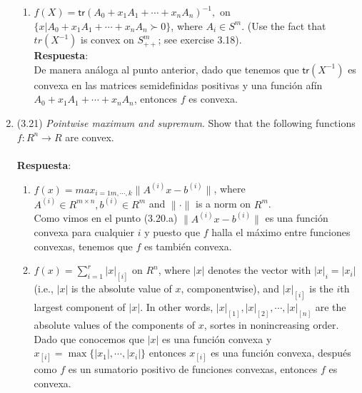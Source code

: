 \documentclass[12pt, oneside]{article}%
\begin{document}
\begin{enumerate}
\begin{enumerate}
    \item $f(X) = \textsf{tr}(A_0 + x_1A_1 + \cdots + x_nA_n)^{-1}, $ on $\{ x | A_0+x_1A_1 + \cdots + x_nA_n \succ 0\}$, where $A_i \in S^m$. (Use the fact that $tr(X^{-1})$ is convex on $S_{++}^m$; see exercise 3.18).\\
    \textbf{Respuesta}: \\
    De manera análoga al punto anterior, dado que tenemos que $\textsf{tr}(X^{-1})$ es convexa en las matrices semidefinidas positivas y una función afín  $A_0 + x_1A_1 + \cdots + x_nA_n$, entonces $f$ es convexa.
\end{enumerate}
\item (3.21) \textit{Pointwise maximum and supremum}. Show that the following functions $f: R^n \rightarrow R$ are convex. \\\\
\textbf{Respuesta}:
\begin{enumerate}
    \item $f(x) = max_{i=1m,\cdots,k} \|A^{(i)}x- b^{(i)}\|$, where $A^{(i)} \in R^{m \times n}, b^{(i)} \in R^m$ and $\|\cdot\|$ is a norm on $R^m$.\\
    Como vimos en el punto (3.20.a) $\|A^{(i)}x- b^{(i)}\|$ es una función convexa para cualquier $i$ y puesto que $f$ halla el máximo entre funciones convexas, tenemos que $f$ es también convexa.
    \item $f(x) = \sum_{i=1}^r |x|_{[i]}$ on $R^n$, where $|x|$ denotes the vector with $|x|_i = |x_i|$ (i.e., $|x|$ is the absolute value of $x$, componentwise), and $|x|_{[i]}$ is the $i$th largest component of $|x|$. In other words, $|x|_{[1]}, |x|_{[2]}, \cdots ,|x|_{[n]}$ are the absolute values of the components of $x$, sortes in nonincreasing order. \\
    Dado que conocemos que $|x|$ es una función convexa y $x_{[i]}=\max\{|x_1|,\cdots,|x_i|\}$ entonces $x_{[i]}$ es una función convexa, después como $f$ es un sumatorio positivo de funciones convexas, entonces $f$ es convexa.
\end{enumerate}


\end{enumerate}
\end{document}
